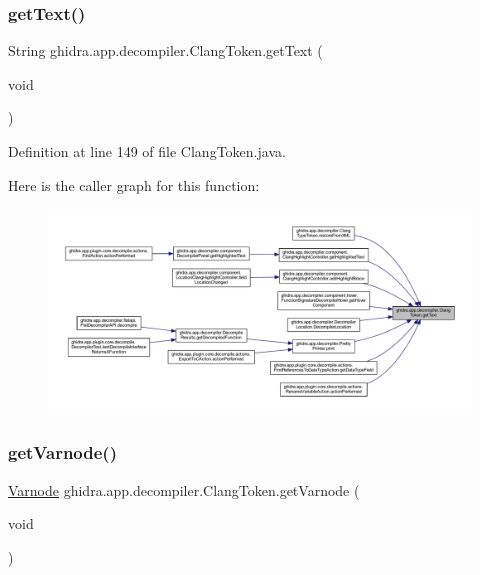 \subsubsection{\texorpdfstring{getText()}{getText()}}
{\footnotesize\ttfamily String ghidra.\+app.\+decompiler.\+Clang\+Token.\+get\+Text (\begin{DoxyParamCaption}\item[{void}]{ }\end{DoxyParamCaption})\hspace{0.3cm}{\ttfamily [inline]}}



Definition at line 149 of file Clang\+Token.\+java.

Here is the caller graph for this function\+:
\nopagebreak
\begin{figure}[H]
\begin{center}
\leavevmode
\includegraphics[width=350pt]{classghidra_1_1app_1_1decompiler_1_1_clang_token_a416468e5684d3f35aad5c82ce9ee3943_icgraph}
\end{center}
\end{figure}
\mbox{\label{classghidra_1_1app_1_1decompiler_1_1_clang_token_a21f48d0c10bcae5c9d19d1f99fc6a407}} 
\subsubsection{\texorpdfstring{getVarnode()}{getVarnode()}}
{\footnotesize\ttfamily \mbox{\hyperlink{class_varnode}{Varnode}} ghidra.\+app.\+decompiler.\+Clang\+Token.\+get\+Varnode (\begin{DoxyParamCaption}\item[{void}]{ }\end{DoxyParamCaption})\hspace{0.3cm}{\ttfamily [inline]}}

